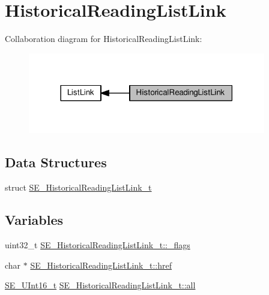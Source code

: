 \hypertarget{group__HistoricalReadingListLink}{}\section{Historical\+Reading\+List\+Link}
\label{group__HistoricalReadingListLink}
Collaboration diagram for Historical\+Reading\+List\+Link\+:\nopagebreak
\begin{figure}[H]
\begin{center}
\leavevmode
\includegraphics[width=294pt]{group__HistoricalReadingListLink}
\end{center}
\end{figure}
\subsection*{Data Structures}
\begin{DoxyCompactItemize}
\item 
struct \hyperlink{structSE__HistoricalReadingListLink__t}{S\+E\+\_\+\+Historical\+Reading\+List\+Link\+\_\+t}
\end{DoxyCompactItemize}
\subsection*{Variables}
\begin{DoxyCompactItemize}
\item 
uint32\+\_\+t \hyperlink{group__HistoricalReadingListLink_ga6a915ba35644446ae6a70f7eec8aa2c4}{S\+E\+\_\+\+Historical\+Reading\+List\+Link\+\_\+t\+::\+\_\+flags}
\item 
char $\ast$ \hyperlink{group__HistoricalReadingListLink_gaec0f08b36bb8f6e6f61a4aa74bd1bbcb}{S\+E\+\_\+\+Historical\+Reading\+List\+Link\+\_\+t\+::href}
\item 
\hyperlink{group__UInt16_gac68d541f189538bfd30cfaa712d20d29}{S\+E\+\_\+\+U\+Int16\+\_\+t} \hyperlink{group__HistoricalReadingListLink_gaad484f3ec067fe1449f8cdc87af67ee0}{S\+E\+\_\+\+Historical\+Reading\+List\+Link\+\_\+t\+::all}
\end{DoxyCompactItemize}


